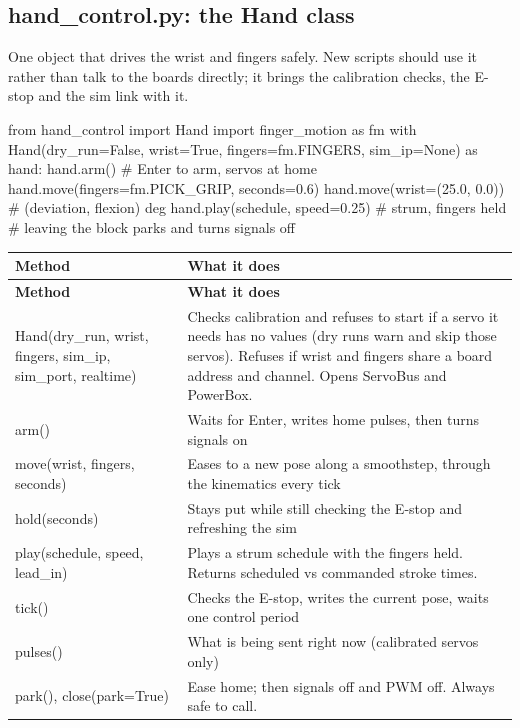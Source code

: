 \documentclass[11pt,letterpaper]{article}
\newcommand{\code}[1]{\textcolor{codeblue}{\ttfamily\smaller\relax #1}}
\begin{document}
\subsection{hand\_control.py: the Hand class}
One object that drives the wrist and fingers safely. New scripts should use it rather than talk to the boards directly; it brings the calibration checks, the E-stop and the sim link with it.

\begin{codeblock}
from hand_control import Hand
import finger_motion as fm
with Hand(dry_run=False, wrist=True, fingers=fm.FINGERS, sim_ip=None) as hand:
    hand.arm()                                  # Enter to arm, servos at home
    hand.move(fingers=fm.PICK_GRIP, seconds=0.6)
    hand.move(wrist=(25.0, 0.0))                # (deviation, flexion) deg
    hand.play(schedule, speed=0.25)             # strum, fingers held
# leaving the block parks and turns signals off
\end{codeblock}
{\small
\begin{longtable}{|>{\raggedright\arraybackslash}p{}|>{\raggedright\arraybackslash}p{}|}
\hline
\rowcolor{tblhead}\textbf{Method} & \textbf{What it does} \\ \hline
\endfirsthead
\hline
\rowcolor{tblhead}\textbf{Method} & \textbf{What it does} \\ \hline
\endhead
\code{Hand(dry\_\allowbreak{}run,\allowbreak{} wrist,\allowbreak{} fingers,\allowbreak{} sim\_\allowbreak{}ip,\allowbreak{} sim\_\allowbreak{}port,\allowbreak{} realtime)} & Checks calibration and refuses to start if a servo it needs has no values (dry runs warn and skip those servos). Refuses if wrist and fingers share a board address and channel. Opens \code{ServoBus} and \code{PowerBox}. \\ \hline
\code{arm()} & Waits for Enter, writes home pulses, then turns signals on \\ \hline
\code{move(wrist,\allowbreak{} fingers,\allowbreak{} seconds)} & Eases to a new pose along a smoothstep, through the kinematics every tick \\ \hline
\code{hold(seconds)} & Stays put while still checking the E-stop and refreshing the sim \\ \hline
\code{play(schedule,\allowbreak{} speed,\allowbreak{} lead\_\allowbreak{}in)} & Plays a strum schedule with the fingers held. Returns scheduled vs commanded stroke times. \\ \hline
\code{tick()} & Checks the E-stop, writes the current pose, waits one control period \\ \hline
\code{pulses()} & What is being sent right now (calibrated servos only) \\ \hline
\code{park()}, \code{close(park=\allowbreak{}True)} & Ease home; then signals off and PWM off. Always safe to call. \\ \hline
\end{longtable}}
\end{document}
